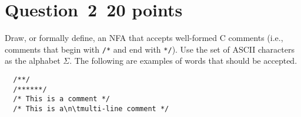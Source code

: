 \documentclass[10pt]{article}
\begin{document}
\section*{Question~2~\hfill 20 points}

Draw, or formally define, 
an NFA that accepts well-formed C comments
(i.e., comments that begin with \verb|/*|
and end with \verb|*/|).
Use the set of ASCII characters as the alphabet $\Sigma$.
The following are examples of words that should be accepted.
\begin{verbatim}
  /**/
  /******/
  /* This is a comment */
  /* This is a\n\tmulti-line comment */
\end{verbatim}
\end{document}
